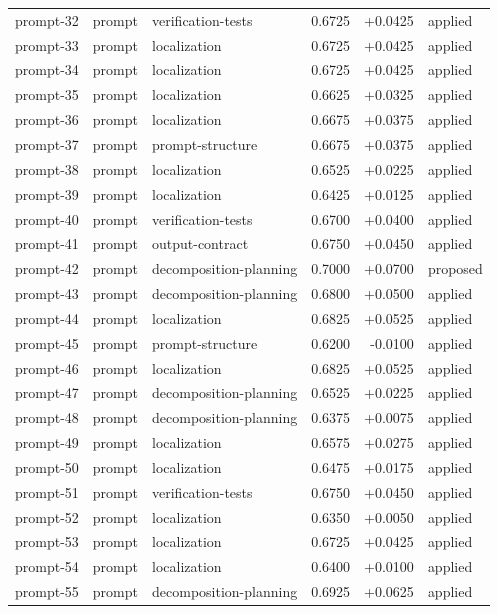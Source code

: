 \begin{center}
\begin{longtable}{llp{5.2cm}rrl}
prompt-32 & prompt & verification-tests & 0.6725 & +0.0425 & applied \\
prompt-33 & prompt & localization & 0.6725 & +0.0425 & applied \\
prompt-34 & prompt & localization & 0.6725 & +0.0425 & applied \\
prompt-35 & prompt & localization & 0.6625 & +0.0325 & applied \\
prompt-36 & prompt & localization & 0.6675 & +0.0375 & applied \\
prompt-37 & prompt & prompt-structure & 0.6675 & +0.0375 & applied \\
prompt-38 & prompt & localization & 0.6525 & +0.0225 & applied \\
prompt-39 & prompt & localization & 0.6425 & +0.0125 & applied \\
prompt-40 & prompt & verification-tests & 0.6700 & +0.0400 & applied \\
prompt-41 & prompt & output-contract & 0.6750 & +0.0450 & applied \\
prompt-42 & prompt & decomposition-planning & 0.7000 & +0.0700 & proposed \\
prompt-43 & prompt & decomposition-planning & 0.6800 & +0.0500 & applied \\
prompt-44 & prompt & localization & 0.6825 & +0.0525 & applied \\
prompt-45 & prompt & prompt-structure & 0.6200 & -0.0100 & applied \\
prompt-46 & prompt & localization & 0.6825 & +0.0525 & applied \\
prompt-47 & prompt & decomposition-planning & 0.6525 & +0.0225 & applied \\
prompt-48 & prompt & decomposition-planning & 0.6375 & +0.0075 & applied \\
prompt-49 & prompt & localization & 0.6575 & +0.0275 & applied \\
prompt-50 & prompt & localization & 0.6475 & +0.0175 & applied \\
prompt-51 & prompt & verification-tests & 0.6750 & +0.0450 & applied \\
prompt-52 & prompt & localization & 0.6350 & +0.0050 & applied \\
prompt-53 & prompt & localization & 0.6725 & +0.0425 & applied \\
prompt-54 & prompt & localization & 0.6400 & +0.0100 & applied \\
prompt-55 & prompt & decomposition-planning & 0.6925 & +0.0625 & applied \\

\end{longtable}
\end{center}
